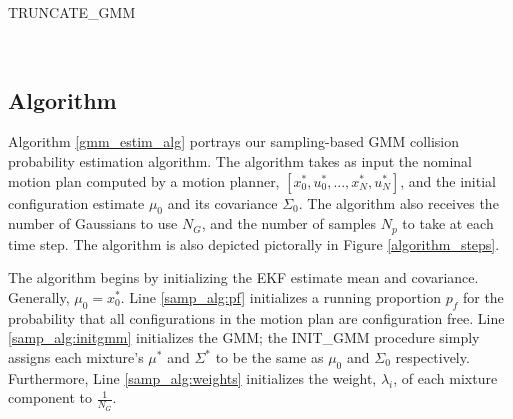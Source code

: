 \documentclass[journal]{IEEEtran}
\begin{document}
\begin{algorithm}
  \caption{TRUNCATE\_GMM}
  \begin{algorithmic}[1]
     \label{trunc_alg:sample}
     \label{trunc_alg:collision_free}
    \STATE{$[F_{1},...,F_{N_G}]\gets [0,...,0]$} \label{trunc_alg:nocoll_counts}
     \label{trunc_alg:total_collcount}
     \label{trunc_alg:mainloop_begin}
    \ELSE
     \label{trunc_alg:chiupdate}
    \ENDIF
    \ENDFOR
    \ENDFOR \label{trunc_alg:mainloop_end}

     \label{trunc_alg:mean_covbegin}
     \label{trunc_alg:weightupdate}
    \ENDFOR \label{trunc_alg:mean_covend}

    \\%
  \end{algorithmic}
\label{trunc_gmm}
\end{algorithm}

\subsection{Algorithm}

Algorithm \ref{gmm_estim_alg} portrays our sampling-based GMM collision probability estimation algorithm. The algorithm takes as input the nominal motion plan computed by a motion planner, $[x_0^*,u_0^*,...,x_N^*,u_N^*]$, and the initial configuration estimate $\mu_0$ and its covariance $\Sigma_0$. The algorithm also receives the number of Gaussians to use $N_G$, and the number of samples $N_p$ to take at each time step. The algorithm is also depicted pictorally in Figure \ref{algorithm_steps}.

The algorithm begins by initializing the EKF estimate mean and covariance. Generally, $\mu_0 = x_0^*$. Line \ref{samp_alg:pf} initializes a running proportion $p_f$ for the probability that all configurations in the motion plan are configuration free. Line \ref{samp_alg:initgmm} initializes the GMM; the INIT\_GMM procedure simply assigns each mixture's $\mu^*$ and $\Sigma^*$ to be the same as $\mu_0$ and $\Sigma_0$ respectively. Furthermore, Line \ref{samp_alg:weights} initializes the weight, $\lambda_i$, of each mixture component to $\frac{1}{N_G}$.
\end{document}
